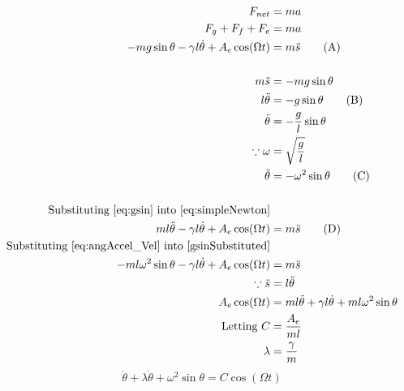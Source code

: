 \documentclass[letterpaper, 12pt]{article}
\begin{document}
\begin{align*}
    F_{net}                                                                & = ma
    \\
    F_g + F_f + F_e                                                        & = ma
    \\
    -mg\sin\theta - \gamma l\dot\theta + A_e \cos (\Omega t)               & = m\ddot s \tag{A} \label{eq:simpleNewton}
    \\
    \\
    m\ddot s                                                               & = -mg \sin\theta
    \\
    l\ddot \theta                                                          & = -g\sin\theta \tag{B} \label{eq:gsin}
    \\
    \ddot\theta                                                            & = -\frac{g}{l}\sin\theta
    \\
    \because \omega                                                        & = \sqrt{\frac{g}{l}}
    \\
    \ddot\theta                                                            & = -\omega^2\sin\theta \tag{C} \label{eq:angAccel_Vel}
    \\
    \\
    \text{Substituting \ref*{eq:gsin} into \ref*{eq:simpleNewton}}         &
    \\
    ml\ddot\theta - \gamma l\dot\theta + A_e \cos (\Omega t)               & = m\ddot s \tag{D} \label{gsinSubstituted}
    \\
    \text{Substituting \ref*{eq:angAccel_Vel} into \ref*{gsinSubstituted}} &
    \\
    -ml\omega^2\sin\theta - \gamma l\dot\theta + A_e \cos (\Omega t)       & = m\ddot s
    \\
    \because \ddot s                                                       & = l\ddot \theta
    \\
    A_e\cos(\Omega t)                                                      & = ml\ddot \theta + \gamma l\dot\theta + ml\omega^2\sin\theta
    \\
    \text{Letting } C                                                      & = \frac{A_e}{ml}
    \\
    \lambda                                                                & = \frac{\gamma}{m}
\end{align*}
\begin{equation} \label{eq:noApproximate}
    \ddot\theta + \lambda\dot\theta + \omega^2\sin\theta = C\cos(\Omega t)
\end{equation}
\end{document}
